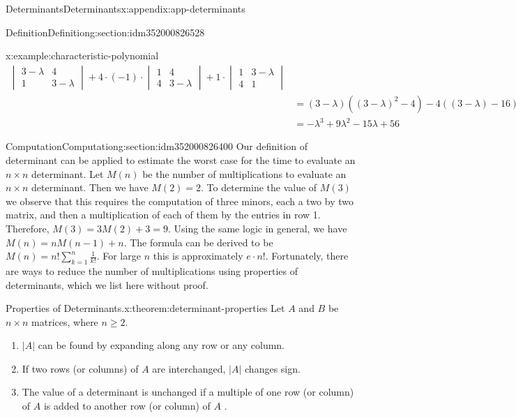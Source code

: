 \documentclass[oneside,10pt,]{book}
\begin{document}
\begin{appendixptx}{Determinants}{}{Determinants}{}{}{x:appendix:app-determinants}
\begin{sectionptx}{Definition}{}{Definition}{}{}{g:section:idm352000826528}
\begin{example}{}{x:example:characteristic-polynomial}
\begin{equation*}
\begin{split}
\begin{vmatrix}
3 - \lambda & 4 \\
1 & 3 - \lambda 
\end{vmatrix}
+ 4 \cdot (-1)\cdot \begin{vmatrix}
1 & 4 \\
4 &  3 - \lambda
\end{vmatrix}
+ 1\cdot  \begin{vmatrix}					
1 & 3 - \lambda  \\
4 & 1  
\end{vmatrix} \\
&=(3-\lambda)((3-\lambda)^2-4) - 4((3-\lambda)-16) + (1-4(3-\lambda))\\
&=-\lambda ^3+9 \lambda ^2-15 \lambda +56
\end{split}
\end{equation*}
%
\end{example}
\end{sectionptx}
%
%
\typeout{************************************************}
\typeout{************************************************}
%
\begin{sectionptx}{Computation}{}{Computation}{}{}{g:section:idm352000826400}
Our definition of determinant can be applied to estimate the worst case for the time to evaluate an \(n \times n\) determinant.   Let \(M(n)\) be the number of multiplications to evaluate an \(n \times n\) determinant.  Then we have  \(M(2)=2\).  To determine the value of \(M(3)\) we observe that this requires the computation of three minors, each a two by two matrix, and then a multiplication of each of them by the entries in row 1.  Therefore, \(M(3)= 3 M(2) + 3 = 9\).  Using the same logic in general, we have \(M(n)= n M(n-1) + n\).  The formula can be derived to be \(M(n) =n! \sum _{k=1}^n \frac{1}{k!}\).  For large \(n\) this is approximately \(e\cdot n!\).  Fortunately, there are ways to reduce the number of multiplications using properties of determinants, which we list here without proof.%
\begin{theorem}{Properties of Determinants.}{}{x:theorem:determinant-properties}%
Let \(A\)  and \(B\) be \(n \times n\) matrices, where \(n \geq 2\).%
\begin{enumerate}
\item{}\(\lvert A \rvert\) can be found by expanding along any row or any column.%
\item{}If two rows (or columns) of \(A\) are interchanged, \(\lvert A \rvert\) changes sign.%
\item{}The value of a determinant is unchanged if a multiple of one row (or column) of \(A\) is added to another row (or column) of \(A\) .%

\end{enumerate}
\end{theorem}
\end{sectionptx}
\end{appendixptx}
\end{document}
